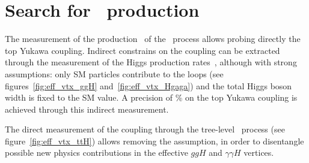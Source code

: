\section{\texorpdfstring{Search for \ttH\ production}{Search for ttH production}}
The measurement of the production \xsec\ of the \ttH\ process allows probing directly the top Yukawa coupling.
Indirect constrains on the coupling can be extracted through the measurement of the Higgs production rates~\cite{ATLAS-CONF-2015-007}, 
although with strong assumptions: only SM particles contribute to the loops (see figures~\ref{fig:eff_vtx_ggH} and~\ref{fig:eff_vtx_Hgaga}) and the total Higgs boson width is fixed to the SM value.
A precision of \unit[20]{\%} on the top Yukawa coupling is achieved through this indirect measurement.

The direct measurement of the coupling through the tree-level \ttH\ process (see figure~\ref{fig:eff_vtx_ttH}) allows removing the assumption, in order to disentangle possible new physics contributions in the effective $ggH$ and $\gamma\gamma H$ vertices.

